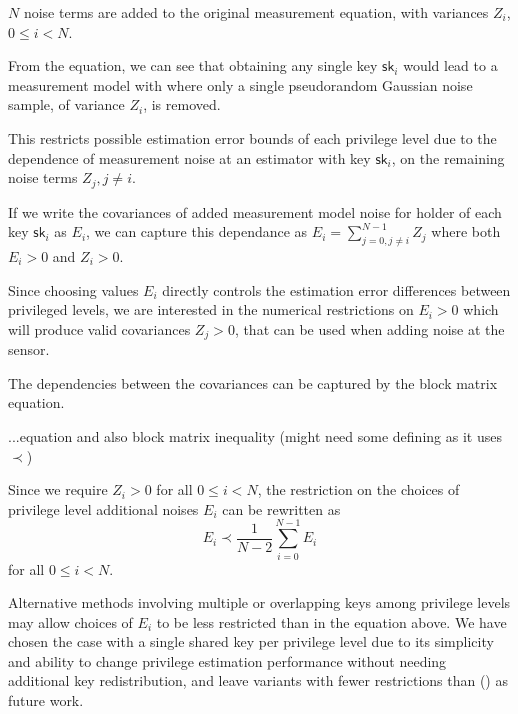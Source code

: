 \documentclass[conference]{IEEEtran}
\theoremstyle{definition}
\theoremstyle{definition}
\theoremstyle{remark}
\begin{document}
$N$ noise terms are added to the original measurement equation, with variances $Z_i$, $0 \leq i < N$.

From the equation, we can see that obtaining any single key $\mathsf{sk}_i$ would lead to a measurement model with where only a single pseudorandom Gaussian noise sample, of variance $Z_i$, is removed.

This restricts possible estimation error bounds of each privilege level due to the dependence of measurement noise at an estimator with key $\mathsf{sk}_i$, on the remaining noise terms $Z_j,j \neq i$.

If we write the covariances of added measurement model noise for holder of each key $\mathsf{sk}_i$ as $E_i$, we can capture this dependance as $E_i=\sum^{N-1}_{j=0,j \neq i}Z_j$ where both $E_i>0$ and $Z_i>0$.

Since choosing values $E_i$ directly controls the estimation error differences between privileged levels, we are interested in the numerical restrictions on $E_i>0$ which will produce valid covariances $Z_j>0$, that can be used when adding noise at the sensor.

The dependencies between the covariances can be captured by the block matrix equation.

...equation and also block matrix inequality (might need some defining as it uses $\prec$)

Since we require $Z_i>0$ for all $0\leq i< N$, the restriction on the choices of privilege level additional noises $E_i$ can be rewritten as
\begin{equation}
   E_i \prec \frac{1}{N-2}\sum_{i=0}^{N-1}E_i
\end{equation}
for all $0 \leq i < N$.

Alternative methods involving multiple or overlapping keys among privilege levels may allow choices of $E_i$ to be less restricted than in the equation above. We have chosen the case with a single shared key per privilege level due to its simplicity and ability to change privilege estimation performance without needing additional key redistribution, and leave variants with fewer restrictions than () as future work.

% 
%                                                                                        
%                                                                                        
%                                                                                        
% 
\end{document}
